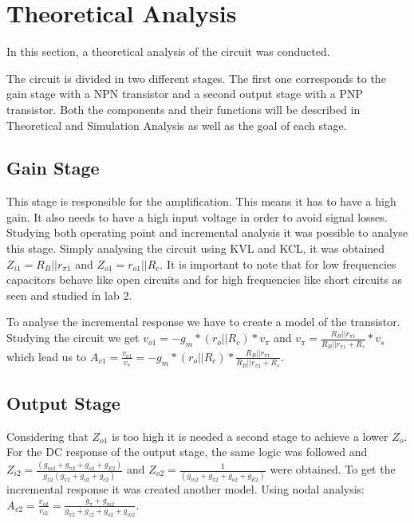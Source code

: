 \section{Theoretical Analysis} \label{section:theo}


\par In this section, a theoretical analysis of the circuit was conducted.

The circuit is divided in two different stages. The first one corresponds to the gain stage with a NPN transistor and a second output stage with a PNP transistor. Both the components and their functions will be described in Theoretical and Simulation Analysis as well as the goal of each stage.

\subsection{Gain Stage}
This stage is responsible for the amplification. This means it has to have a high gain. It also needs to have a high input voltage in order to avoid signal losses. Studying both operating point and incremental analysis it was possible to analyse this stage.
Simply analysing the circuit using KVL and KCL, it was obtained $Z_{i1}=R_B||r_{\pi 1}$ and $Z_{o1}=r_{o1}||R_c$. It is important to note that for low frequencies capacitors behave like open circuits and for high frequencies like short circuits as seen and studied in lab 2.

To analyse the incremental response we have to create a model of the transistor. Studying the circuit we get $v_{o1}=-g_m * (r_o||R_c) * v_{\pi}$ and $v_{\pi}= \frac{R_B||r_{\pi 1}}{R_B||r_{\pi 1}+R_s} * v_s $ which lead us to $A_{v1} = \frac{v_{o1}}{v_s} = -g_m * (r_o||R_c)*\frac{R_B||r_{\pi 1}}{R_B||r_{\pi 1}+R_s}$.


\subsection{Output Stage}

Considering that $Z_{o1}$ is too high it is needed a second stage to achieve a lower $Z_{o}$. 
For the DC response of the output stage, the same logic was followed and $Z_{i2}=\frac{(g_{m2}+g_{\pi 2}+g_{o2}+g_{E2})}{g_{\pi 2}(g_{\pi 2}+g_{o2}+g_{e2})}$ and $Z_{o2}= \frac{1}{(g_{m2}+g_{\pi2}+g_{o2}+g_{E2})}$ were obtained. To get the incremental response it was created another model. Using nodal analysis: $A_{v2} = \frac{v_{o2}}{v_{i2}} = \frac{g_{\pi} + g_{m2} }{g_{\pi 2}+g_{z2}+g_{o2}+g_{m2}}$.


